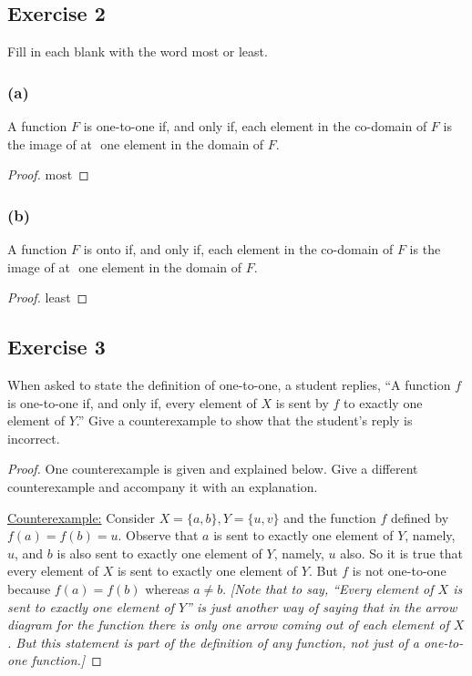 \documentclass[14pt]{extarticle}
\newcommand{\fbl}{\underline{\hspace{1cm}}\,\,}
\begin{document}
\subsection{Exercise 2}
Fill in each blank with the word most or least.

\subsubsection{(a)}
A function $F$ is one-to-one if, and only if, each element in the co-domain of $F$ is the image of at \fbl one element
in the domain of $F$.

\begin{proof}
    most
\end{proof}

\subsubsection{(b)}
A function $F$ is onto if, and only if, each element in the co-domain of $F$ is the image of at \fbl one element in the
domain of $F$.

\begin{proof}
    least
\end{proof}

\subsection{Exercise 3}
When asked to state the definition of one-to-one, a student replies, “A function $f$ is one-to-one if, and only if,
every element of $X$ is sent by $f$ to exactly one element of $Y$.” Give a counterexample to show that the student’s
reply is incorrect.

\begin{proof}
    One counterexample is given and explained below. Give a different counterexample and accompany it with an explanation.

    \underline{Counterexample:} Consider \(X = \{a,b\}, Y = \{u,v\}\) and the function $f$ defined by\(f(a) = f(b) =u\).
    Observe that $a$ is sent to exactly one element of $Y$, namely, $u$, and $b$ is also sent to exactly one element of
    $Y$, namely, $u$ also. So it is true that every element of $X$ is sent to exactly one element of $Y$. But $f$ is not
    one-to-one because $f(a) = f(b)$ whereas $a \neq b$. {\it [Note that to say, “Every element of $X$ is sent to exactly
                one element of $Y$” is just another way of saying that in the arrow diagram for the function there is only one arrow
                coming out of each element of $X$. But this statement is part of the definition of any function, not just of a
                one-to-one function.]}
\end{proof}
\end{document}
